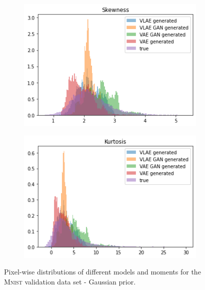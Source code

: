 \documentclass{beamer}
\begin{document}
\begin{frame}
\begin{figure}
\begin{subfigure}{0.48\textwidth}
\includegraphics[width=\textwidth]{images/generated_vs_true/mnist/mnist_vs_models_skew_gauss_post.png}
\end{subfigure}
\hfill
\begin{subfigure}{0.48\textwidth}
\centering
\includegraphics[width=\textwidth]{images/generated_vs_true/mnist/mnist_vs_models_kurt_gauss_post.png}
\end{subfigure}
\caption{Pixel-wise distributions of different models and moments for the \textsc{Mnist} validation data set - Gaussian prior.}
\end{figure}
\end{frame}
\end{document}
